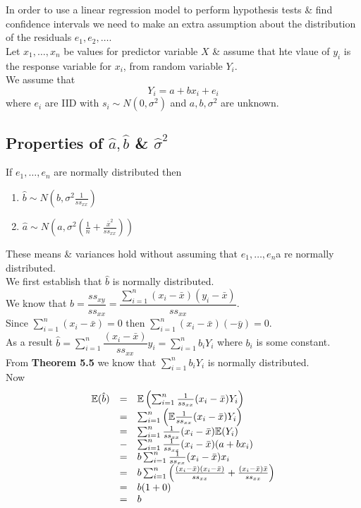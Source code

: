 \documentclass[11pt,a4paper]{article}
\begin{document}
In order to use a linear regression model to perform hypothesis tests \& find confidence intervals we need to make an extra assumption about the distribution of the residuals $e_1,e_2,\dots$.\\

Let $x_1,\dots,x_n$ be values for predictor variable $X$ \& assume that hte vlaue of $y_i$ is the response variable for $x_i$, from random variable $Y_i$.\\
We assume that
$$Y_i=a+bx_i+e_i$$
where $e_i$ are IID with $s_i\sim N(0,\sigma^2)$ and $a,b,\sigma^2$ are unknown.\\

\subsection{Properties of $\hat{a},\hat{b}$ \& $\hat{\sigma}^2$}

If $e_1,\dots,e_n$ are normally distributed then
\begin{enumerate}[label=\roman*)]
	\item $\hat{b}\sim N(b,\sigma^2\frac{1}{ss_{xx}})$
	\item $\hat{a}\sim N(a,\sigma^2(\frac{1}{n}+\frac{\bar{x}^2}{ss_{xx}}))$
\end{enumerate}
\nb These means \& variances hold without assuming that $e_1,\dots,e_n$a re normally distributed.\\

We first establish that $\hat{b}$ is normally distributed.\\
We know that $\hat{b}=\dfrac{ss_{xy}}{ss_{xx}}=\dfrac{\sum_{i=1}^n(x_i-\bar{x})(y_i-\bar{x})}{ss_{xx}}$.\\
Since $\sum_{i=1}^n(x_i-\bar{x})=0$ then $\sum_{i=1}^n(x_i-\bar{x})(-\bar{y})=0$.\\
As a result $\hat{b}=\sum\limits_{i=1}^n\dfrac{(x_i-\bar{x})}{ss_{xx}}y_i=\sum\limits_{i=1}^nb_iY_i$ where $b_i$ is some constant.\\
From \textbf{Theorem 5.5} we know that $\sum_{i=1}^nb_iY_i$ is normally distributed.\\
Now
\[\begin{array}{rcl}
\mathbb{E}(\hat{b})&=&\mathbb{E}\left(\sum_{i=1}^n\frac{1}{ss_{xx}}(x_i-\bar{x})Y_i\right)\\
&=&\sum_{i=1}^n\left(\mathbb{E}\frac{1}{ss_{xx}}(x_i-\bar{x})Y_i\right)\\
&=&\sum_{i=1}^n\frac{1}{ss_{xx}}(x_i-\bar{x})\mathbb{E}(Y_i)\\
&-&\sum_{i=1}^n\frac{1}{ss_{xx}}(x_i-\bar{x})(a+bx_i)\\
&=&b\sum_{i=1}^n\frac{1}{ss_{xx}}(x_i-\bar{x})x_i\\
&=&b\sum_{i=1}^n\left(\frac{(x_i-\bar{x})(x_i-\bar{x})}{ss_{xx}}+\frac{(x_i-\bar{x})\bar{x}}{ss_{xx}}\right)\\
&=&b(1+0)\\
&=&b
\end{array}\]
\end{document}
